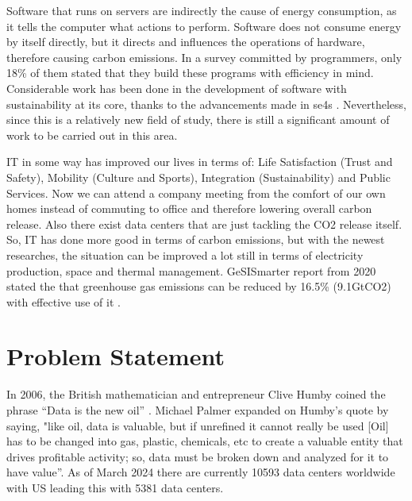 \documentclass[
  a4paper,  %
  twoside,  %
  bibliography=totoc,
  headsepline,
  cleardoublepage=empty,
  parskip=half,
  draft=false
]{scrbook}
\begin{document}
Software that runs on servers are indirectly the cause of energy consumption, as it tells the computer what actions to perform\cite{Britannica_2024}. Software does not consume energy by itself directly, but it directs and influences the operations of hardware, therefore causing carbon emissions. In a survey committed by programmers, only 18\% of them stated that they build these programs with efficiency in mind\cite{pang2015programmers}. Considerable work has been done in the development of software with sustainability at its core, thanks to the advancements made in \gls{se4s} \cite{swacha2022models}. Nevertheless, since this is a relatively new field of study, there is still a significant amount of work to be carried out in this area.


IT in some way has improved our lives in terms of: Life Satisfaction (Trust and Safety), Mobility (Culture and Sports), Integration (Sustainability) and Public Services\cite{nevado2019improving}. Now we can attend a company meeting from the comfort of our own homes instead of commuting to office and therefore lowering overall carbon release. Also there exist data centers that are just tackling the CO2 release itself. So, IT has done more good in terms of carbon emissions, but with the newest researches, the situation can be improved a lot still in terms of electricity production, space and thermal management. GeSISmarter report from 2020 stated the that greenhouse gas emissions can be reduced by 16.5\% (9.1GtCO2) with effective use of \gls{it} \cite{cosar2019carbon}. 


\section{Problem Statement}

In 2006, the British mathematician and entrepreneur Clive Humby coined the phrase “Data is the new oil” \cite{humby2006data}. Michael Palmer expanded on Humby's quote by saying, "like oil, data is valuable, but if unrefined it cannot really be used [Oil] has to be changed into gas, plastic, chemicals, etc to create a valuable entity that drives profitable activity; so, data must be broken down and analyzed for it to have value”\cite{palmer2006}. As of March 2024 there are currently 10593 data centers worldwide with US leading this with 5381 data centers\cite{statista_2024}. 
\end{document}
